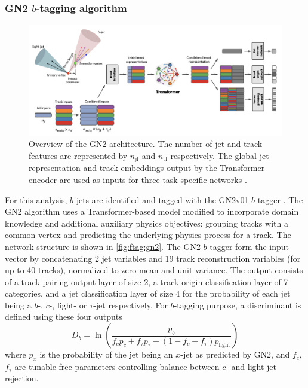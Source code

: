 \documentclass[../thesis.tex]{subfiles}
\begin{document}
\subsubsection*{GN2 $b$-tagging algorithm}
\label{sec:gn2}

\begin{figure}[!htbp]
\begin{center}
\includegraphics[width=\linewidth]{fig/reco_ftag_gn2.png}
\caption[Overview of the GN2 architecture. The number of jet and track features are represented by $n_\text{jf}$ and $n_\text{tf}$ respectively. The global jet representation and track embeddings output by the Transformer encoder are used as inputs for three task-specific networks.]{\label{fig:ftag:gn2}Overview of the GN2 architecture. The number of jet and track features are represented by $n_\text{jf}$ and $n_\text{tf}$ respectively. The global jet representation and track embeddings output by the Transformer encoder are used as inputs for three task-specific networks \citep{ftag:gn2}.}
\end{center}
\end{figure}
For this analysis, $b$-jets are identified and tagged with the GN2v01 $b$-tagger \citep{ftag:gn2}. The GN2 algorithm uses a Transformer-based model \citep{ftag:transformer} modified to incorporate domain knowledge and additional auxiliary physics objectives: grouping tracks with a common vertex and predicting the underlying physics process for a track. The network structure is shown in \autoref{fig:ftag:gn2}. The GN2 $b$-tagger form the input vector by concatenating 2 jet variables and 19 track reconstruction variables (for up to 40 tracks), normalized to zero mean and unit variance. The output consists of a track-pairing output layer of size 2, a track origin classification layer of 7 categories, and a jet classification layer of size 4 for the probability of each jet being a $b$-, $c$-, light- or $\tau$-jet respectively. For $b$-tagging purpose, a discriminant is defined using these four outputs
\begin{equation}
D_b = \ln \left( \displaystyle\frac{p_b}{f_c p_c + f_\tau p_\tau + (1-f_c-f_\tau) p_\text{light}} \right)
\end{equation}
where $p_x$ is the probability of the jet being an $x$-jet as predicted by GN2, and $f_c$, $f_\tau$ are tunable free parameters controlling balance between $c$- and light-jet rejection.
\end{document}
